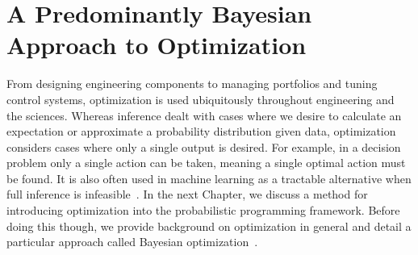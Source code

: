 
\chapter{A Predominantly Bayesian Approach to Optimization}
\label{chp:opt}

From designing engineering components to managing portfolios and tuning control systems,
optimization is used ubiquitously throughout engineering and the sciences.   Whereas inference
dealt with cases where we desire to calculate an expectation or approximate a probability distribution
given data, optimization considers cases where only a single output is desired.  For example, in
a decision problem only a single action can be taken, meaning a single optimal action must be
found.  It is also often used in machine learning as a tractable alternative when full inference
is infeasible~\citep{murphy2012machine}.  In the next Chapter, we discuss a method for introducing
optimization into the probabilistic programming framework.  Before doing this though, we provide
background on optimization in general and detail a particular approach called Bayesian
optimization~\citep{jones1998efficient,shahriari2016taking}.


%



